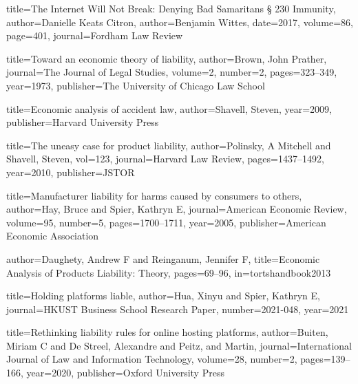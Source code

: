 
{
title={The Internet Will Not Break: Denying Bad Samaritans § 230 Immunity},
author={Danielle Keats Citron},
author={Benjamin Wittes},
date={2017},
volume=86,
page=401,
journal=Fordham Law Review
}




{
  title={Toward an economic theory of liability},
  author={Brown, John Prather},
  journal={The Journal of Legal Studies},
  volume={2},
  number={2},
  pages={323--349},
  year={1973},
  publisher={The University of Chicago Law School}
}



{
  title={Economic analysis of accident law},
  author={Shavell, Steven},
  year={2009},
  publisher={Harvard University Press}
}


{
  title={The uneasy case for product liability},
  author={Polinsky, A Mitchell and Shavell, Steven},
  vol={123},
  journal={Harvard Law Review},
  pages={1437--1492},
  year={2010},
  publisher={JSTOR}
}

{
  title={Manufacturer liability for harms caused by consumers to others},
  author={Hay, Bruce and Spier, Kathryn E},
  journal={American Economic Review},
  volume={95},
  number={5},
  pages={1700--1711},
  year={2005},
  publisher={American Economic Association}
}


{
  author={Daughety, Andrew F and Reinganum, Jennifer F},
  title={Economic Analysis of Products Liability: Theory},
  pages={69--96},
  in={tortshandbook2013}
}


{
  title={Holding platforms liable},
  author={Hua, Xinyu and Spier, Kathryn E},
  journal={HKUST Business School Research Paper},
  number={2021-048},
  year={2021}
}

{
  title={Rethinking liability rules for online hosting platforms},
  author={Buiten, Miriam C and De Streel, Alexandre and Peitz, and Martin},
  journal={International Journal of Law and Information Technology},
  volume={28},
  number={2},
  pages={139--166},
  year={2020},
  publisher={Oxford University Press}
}

